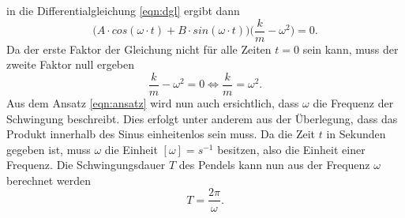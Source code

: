 in die Differentialgleichung \eqref{eqn:dgl} ergibt dann
\begin{equation}
    \biggl(A\cdot cos(\omega\cdot t)+B\cdot sin(\omega\cdot t)\biggr)\biggl(\frac{k}{m}-\omega^2\biggr)=0.
\end{equation}
Da der erste Faktor der Gleichung nicht für alle Zeiten $t=0$ sein kann, muss der zweite Faktor null ergeben
\begin{equation}
    \frac{k}{m}-\omega^2=0 \Leftrightarrow \frac{k}{m}=\omega^2 .
\end{equation}
Aus dem Ansatz \eqref{eqn:ansatz} wird nun auch ersichtlich, dass $\omega$ die Frequenz der Schwingung beschreibt. Dies erfolgt
unter anderem aus der Überlegung, dass das Produkt innerhalb des Sinus einheitenlos sein muss. Da die Zeit $t$ in Sekunden gegeben
ist, muss $\omega$ die Einheit $[\omega]=s^{-1}$ besitzen, also die Einheit einer Frequenz.
Die Schwingungsdauer $T$ des Pendels kann nun aus der Frequenz $\omega$ berechnet werden
\begin{equation}
    T=\frac{2\pi}{\omega}.
\end{equation}

